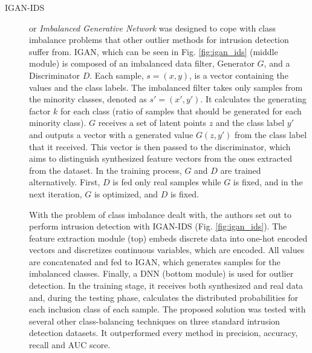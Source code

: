 \begin{description}
    \item[IGAN-IDS \cite{huang.etal_IGAN_2020}] or \textit{Imbalanced Generative Network} was designed to cope with class imbalance problems that other outlier methods for intrusion detection suffer from. IGAN, which can be seen in Fig. \ref{fig:igan_ids} (middle module) is composed of an imbalanced data filter, Generator $G$, and a Discriminator $D$. Each sample, $s=(x,y)$, is a vector containing the values and the class labels. The imbalanced filter takes only samples from the minority classes, denoted as $s'=(x', y')$. It calculates the generating factor $k$ for each class (ratio of samples that should be generated for each minority class).  $G$ receives a set of latent points $z$ and the class label $y'$ and outputs a vector with a generated value $G(z,y')$ from the class label that it received. This vector is then passed to the discriminator, which aims to distinguish synthesized feature vectors from the ones extracted from the dataset. In the training process, $G$ and $D$ are trained alternatively. First, $D$ is fed only real samples while $G$ is fixed, and in the next iteration, $G$ is optimized, and $D$ is fixed. 
    
    With the problem of class imbalance dealt with, the authors set out to perform intrusion detection with IGAN-IDS (Fig. \ref{fig:igan_ids}). The feature extraction module (top) embeds discrete data into one-hot encoded vectors and discretizes continuous variables, which are encoded. All values are concatenated and fed to IGAN, which generates samples for the imbalanced classes. Finally, a DNN (bottom module) is used for outlier detection. In the training stage, it receives both synthesized and real data and, during the testing phase, calculates the distributed probabilities for each inclusion class of each sample. The proposed solution was tested with several other class-balancing techniques on three standard intrusion detection datasets. It outperformed every method in precision, accuracy, recall and AUC score.
\end{description}



